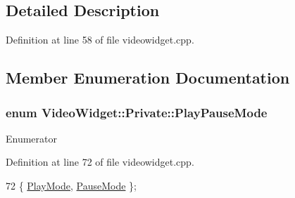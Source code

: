 \subsection{Detailed Description}


Definition at line 58 of file videowidget.\+cpp.



\subsection{Member Enumeration Documentation}
\hypertarget{classVideoWidget_1_1Private_aa685363ecfd1874cfe0a9901cd86ede2}{
\subsubsection[{Play\+Pause\+Mode}]{\setlength{\rightskip}{0pt plus 5cm}enum {\bf Video\+Widget\+::\+Private\+::\+Play\+Pause\+Mode}}}\label{classVideoWidget_1_1Private_aa685363ecfd1874cfe0a9901cd86ede2}
\begin{Desc}
\item[Enumerator]\par
\begin{description}
\item[{\em 
\hypertarget{classVideoWidget_1_1Private_aa685363ecfd1874cfe0a9901cd86ede2a4211aefb1bf1a9dba29b939c6b811d33}{Play\+Mode}\label{classVideoWidget_1_1Private_aa685363ecfd1874cfe0a9901cd86ede2a4211aefb1bf1a9dba29b939c6b811d33}
}]\item[{\em 
\hypertarget{classVideoWidget_1_1Private_aa685363ecfd1874cfe0a9901cd86ede2aab1e1758af40992f1fd9a0e51758c921}{Pause\+Mode}\label{classVideoWidget_1_1Private_aa685363ecfd1874cfe0a9901cd86ede2aab1e1758af40992f1fd9a0e51758c921}
}]\end{description}
\end{Desc}


Definition at line 72 of file videowidget.\+cpp.


\begin{DoxyCode}
72 \{ \hyperlink{classVideoWidget_1_1Private_aa685363ecfd1874cfe0a9901cd86ede2a4211aefb1bf1a9dba29b939c6b811d33}{PlayMode}, \hyperlink{classVideoWidget_1_1Private_aa685363ecfd1874cfe0a9901cd86ede2aab1e1758af40992f1fd9a0e51758c921}{PauseMode} \};
\end{DoxyCode}



